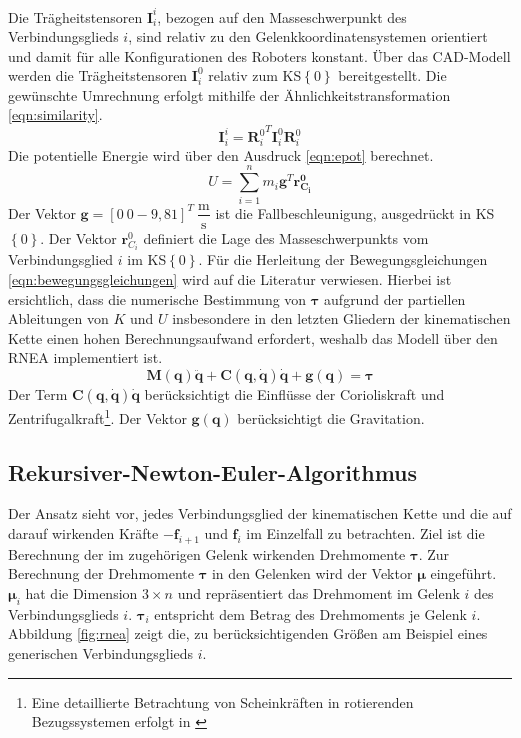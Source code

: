 Die Trägheitstensoren $\bm{I}^{i}_{i}$, bezogen auf den Masseschwerpunkt des Verbindungsglieds $i$, sind relativ zu den Gelenkkoordinatensystemen orientiert und damit für alle Konfigurationen des Roboters konstant. 
Über das CAD-Modell werden die Trägheitstensoren $\bm{I}^{0}_{i}$ relativ zum KS$\left\{0\right\}$ bereitgestellt. Die gewünschte Umrechnung erfolgt mithilfe der Ähnlichkeitstransformation \ref{eqn:similarity}.
%
\begin{equation}
	\label{eqn:similarity}
	\bm{I}^{i}_{i} = {\bm{R}^{0}_i}^T \bm{I}^{0}_{i} \bm{R}^0_i
\end{equation}
%
Die potentielle Energie wird über den Ausdruck \ref{eqn:epot} berechnet.
%
\begin{equation}
	\label{eqn:epot}
	U = \sum_{i=1}^{n} m_i \bm{g}^T\bm{r^0_{C_i}}
\end{equation}
%
Der Vektor $\bm{g} = [0~0-9,81]^T~\dfrac{\text{m}}{\text{s}}$ ist die Fallbeschleunigung, ausgedrückt in KS$\left\{0\right\}$. Der Vektor $\bm{r}^0_{C_i}$ definiert die Lage des Masseschwerpunkts vom Verbindungsglied $i$ im  KS$\left\{0\right\}$. Für die Herleitung der Bewegungsgleichungen \ref{eqn:bewegungsgleichungen} wird auf die Literatur \cite[S.~180 ff.]{Spong.2020} verwiesen. Hierbei ist ersichtlich, dass die numerische Bestimmung von $\bm{\tau}$ aufgrund der partiellen Ableitungen von $K$ und $U$ insbesondere in den letzten Gliedern der kinematischen Kette einen hohen Berechnungsaufwand erfordert, weshalb das Modell über den RNEA implementiert ist. 
%
\begin{equation}
	\label{eqn:bewegungsgleichungen}
	\bm{M}(\bm{q})\ddot{\bm{q}} + \bm{C}(\bm{q},\dot{\bm{q}})\dot{\bm{q}} + \bm{g}(\bm{q}) = \bm{\tau}
\end{equation}
%
Der Term $\bm{C}(\bm{q},\dot{\bm{q}})\dot{\bm{q}}$ berücksichtigt die Einflüsse der Corioliskraft und Zentrifugalkraft\footnote{Eine detaillierte Betrachtung von Scheinkräften in rotierenden Bezugssystemen erfolgt in  \cite[S.~159]{Roth.2016}}. Der Vektor $\bm{g}(\bm{q})$ berücksichtigt die Gravitation. \cite[S.~180~ff.]{Spong.2020}
%
\subsection{Rekursiver-Newton-Euler-Algorithmus}
%
Der Ansatz sieht vor, jedes Verbindungsglied der kinematischen Kette und die auf darauf wirkenden Kräfte $-\boldsymbol{f}_{i+1} $ und $ \boldsymbol{f}_i $ im Einzelfall zu betrachten. Ziel ist die Berechnung der im zugehörigen Gelenk wirkenden Drehmomente $\bm{\tau}$. Zur Berechnung der Drehmomente $\bm{\tau}$ in den Gelenken wird der Vektor $\bm{\mu}$ eingeführt. $\bm{\mu}_i$ hat die Dimension $3 \times n$ und repräsentiert das Drehmoment im Gelenk $i$ des Verbindungsglieds $i$. $\bm{\tau}_i$ entspricht dem Betrag des Drehmoments je Gelenk $i$. Abbildung \ref{fig:rnea} zeigt die, zu berücksichtigenden Größen am Beispiel eines generischen Verbindungsglieds $i$.

